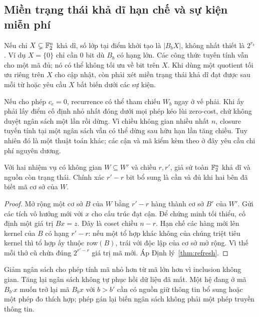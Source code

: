 \subsection{Miền trạng thái khả dĩ hạn chế và sự kiện miễn phí}
Nếu chỉ $X\subsetneq\mathbb F_2^n$ khả dĩ, số lớp tại điểm khởi tạo là $|B_bX|$, không nhất thiết là $2^{r_b}$. Ví dụ $X=\{0\}$ chỉ cần 0 bit dù $B_b$ có hạng lớn. Các công thức tuyến tính vẫn cho một mã đủ; nó có thể không tối ưu về bit trên $X$. Khi dùng một quotient tối ưu riêng trên $X$ cho cập nhật, còn phải xét miền trạng thái khả dĩ đạt được sau mỗi từ hoặc yêu cầu $X$ bất biến dưới các sự kiện.

Nếu cho phép $c_e=0$, recurrence có thể tham chiếu $W_b$ ngay ở vế phải. Khi ấy phải lấy điểm cố định nhỏ nhất đóng dưới mọi phép kéo lùi zero-cost, chứ không duyệt ngân sách một lần rồi dừng. Vì chiều không gian nhiều nhất $n$, closure tuyến tính tại một ngân sách vẫn có thể dừng sau hữu hạn lần tăng chiều. Tuy nhiên đó là một thuật toán khác; các cận và mã kiểm kèm theo ở đây yêu cầu chi phí nguyên dương.

\begin{corollary}\label{cor:linearrepair}
Với hai nhiệm vụ có không gian $W\subseteq W'$ và chiều $r,r'$, giả sử toàn $\mathbb F_2^n$ khả dĩ và nguồn còn trạng thái. Chính xác $r'-r$ bit bổ sung là cần và đủ khi hai bên đã biết mã cơ sở của $W$.
\end{corollary}
\begin{proof}
Mở rộng một cơ sở $B$ của $W$ bằng $r'-r$ hàng thành cơ sở $B'$ của $W'$. Gửi các tích vô hướng mới với $x$ cho cấu trúc đạt cận. Để chứng minh tối thiểu, cố định một giá trị $Bx=z$. Đây là coset chiều $n-r$. Hạn chế các hàng mới lên kernel của $B$ có hạng $r'-r$: nếu một tổ hợp khác không của chúng triệt tiêu kernel thì tổ hợp ấy thuộc row$(B)$, trái với độc lập của cơ sở mở rộng. Vì thế mỗi thớ cũ chứa đúng $2^{r'-r}$ giá trị mã mới. Áp Định lý~\ref{thm:refresh}.
\end{proof}
Giảm ngân sách cho phép tính mã nhỏ hơn từ mã lớn hơn vì inclusion không gian. Tăng lại ngân sách không tự phục hồi dữ liệu đã mất. Một hệ đang ở mã $B_{b'}x$ muốn trở lại mã $B_bx$ với $b>b'$ cần có nguồn giữ thông tin bổ sung hoặc một phép đo thích hợp; phép gán lại biến ngân sách không phải một phép truyền thông tin.


